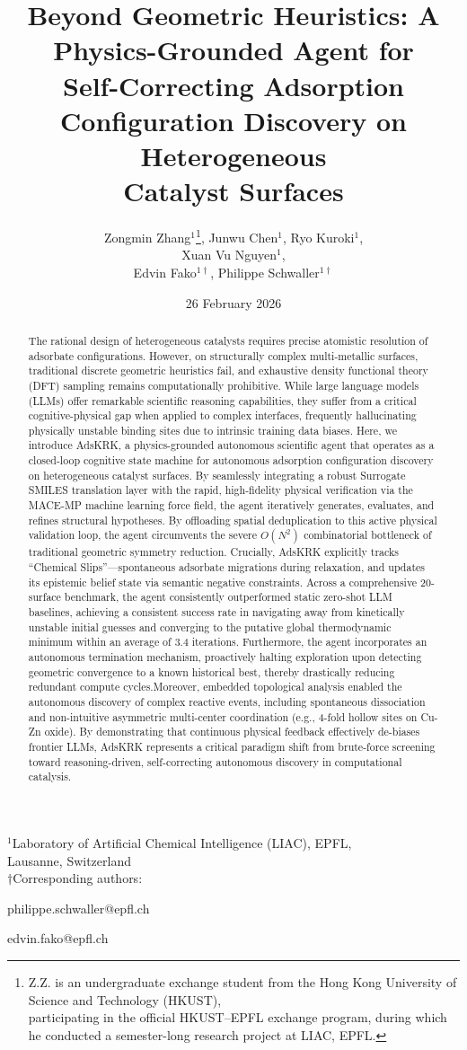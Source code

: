 \documentclass{article}
\title{Beyond Geometric Heuristics: A Physics-Grounded Agent for\\
Self-Correcting Adsorption Configuration Discovery on Heterogeneous\\
Catalyst Surfaces}
\author{
Zongmin Zhang$^{1}$\thanks{Z.Z. is an undergraduate exchange student from the Hong Kong University of Science and Technology (HKUST),\\
participating in the official HKUST--EPFL exchange program, during which he conducted a semester-long research project at LIAC, EPFL.},
Junwu Chen$^{1}$,
Ryo Kuroki$^{1}$,\\
Xuan Vu Nguyen$^{1}$,\\
Edvin Fako$^{1\dagger}$,
Philippe Schwaller$^{1\dagger}$
}
\date{26 February 2026}
\begin{document}
\begingroup\sloppy
\maketitle
\endgroup

\begin{center}
$^{1}$Laboratory of Artificial Chemical Intelligence (LIAC), EPFL,\\
Lausanne, Switzerland\\
$\dagger$Corresponding authors:

philippe.schwaller@epfl.ch

edvin.fako@epfl.ch
\end{center}

\begin{abstract}
The rational design of heterogeneous catalysts requires precise atomistic resolution of adsorbate configurations. However, on structurally complex multi-metallic surfaces, traditional discrete geometric heuristics fail, and exhaustive density functional theory (DFT) sampling remains computationally prohibitive. While large language models (LLMs) offer remarkable scientific reasoning capabilities, they suffer from a critical cognitive-physical gap when applied to complex interfaces, frequently hallucinating physically unstable binding sites due to intrinsic training data biases. Here, we introduce AdsKRK, a physics-grounded autonomous scientific agent that operates as a closed-loop cognitive state machine for autonomous adsorption configuration discovery on heterogeneous catalyst surfaces. By seamlessly integrating a robust Surrogate SMILES translation layer with the rapid, high-fidelity physical verification via the MACE-MP machine learning force field, the agent iteratively generates, evaluates, and refines structural hypotheses. By offloading spatial deduplication to this active physical validation loop, the agent circumvents the severe $O(N^2)$ combinatorial bottleneck of traditional geometric symmetry reduction. Crucially, AdsKRK explicitly tracks ``Chemical Slips''---spontaneous adsorbate migrations during relaxation, and updates its epistemic belief state via semantic negative constraints. Across a comprehensive 20-surface benchmark, the agent consistently outperformed static zero-shot LLM baselines, achieving a consistent success rate in navigating away from kinetically unstable initial guesses and converging to the putative global thermodynamic minimum within an average of 3.4 iterations. Furthermore, the agent incorporates an autonomous termination mechanism, proactively halting exploration upon detecting geometric convergence to a known historical best, thereby drastically reducing redundant compute cycles.Moreover, embedded topological analysis enabled the autonomous discovery of complex reactive events, including spontaneous dissociation and non-intuitive asymmetric multi-center coordination (e.g., 4-fold hollow sites on Cu-Zn oxide). By demonstrating that continuous physical feedback effectively de-biases frontier LLMs, AdsKRK represents a critical paradigm shift from brute-force screening toward reasoning-driven, self-correcting autonomous discovery in computational catalysis.
\end{abstract}
\end{document}
